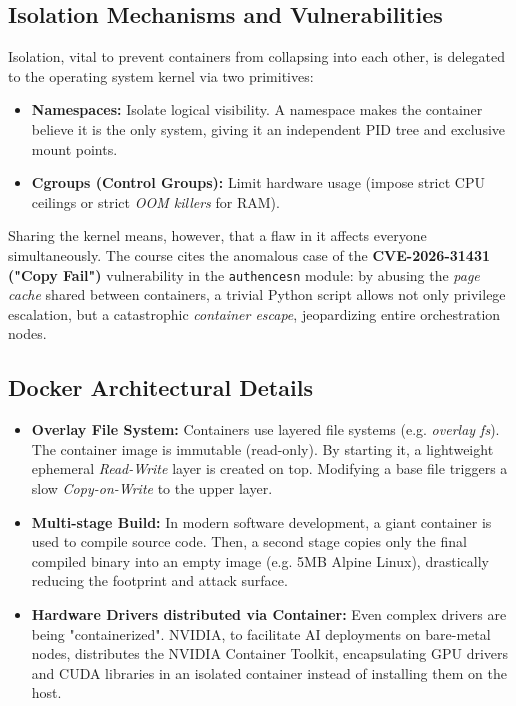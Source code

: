 \subsection{Isolation Mechanisms and Vulnerabilities}
Isolation, vital to prevent containers from collapsing into each other, is delegated to the operating system kernel via two primitives:
\begin{itemize}
    \item \textbf{Namespaces:} Isolate logical visibility. A namespace makes the container believe it is the only system, giving it an independent PID tree and exclusive mount points.
    \item \textbf{Cgroups (Control Groups):} Limit hardware usage (impose strict CPU ceilings or strict \textit{OOM killers} for RAM).
\end{itemize}

Sharing the kernel means, however, that a flaw in it affects everyone simultaneously. The course cites the anomalous case of the \textbf{CVE-2026-31431 ("Copy Fail")} vulnerability in the \texttt{authencesn} module: by abusing the \textit{page cache} shared between containers, a trivial Python script allows not only privilege escalation, but a catastrophic \textit{container escape}, jeopardizing entire orchestration nodes.

\subsection{Docker Architectural Details}
\begin{itemize}
    \item \textbf{Overlay File System:} Containers use layered file systems (e.g. \textit{overlay fs}). The container image is immutable (read-only). By starting it, a lightweight ephemeral \textit{Read-Write} layer is created on top. Modifying a base file triggers a slow \textit{Copy-on-Write} to the upper layer.
    \item \textbf{Multi-stage Build:} In modern software development, a giant container is used to compile source code. Then, a second stage copies only the final compiled binary into an empty image (e.g. 5MB Alpine Linux), drastically reducing the footprint and attack surface.
    \item \textbf{Hardware Drivers distributed via Container:} Even complex drivers are being "containerized". NVIDIA, to facilitate AI deployments on bare-metal nodes, distributes the NVIDIA Container Toolkit, encapsulating GPU drivers and CUDA libraries in an isolated container instead of installing them on the host.
\end{itemize}

